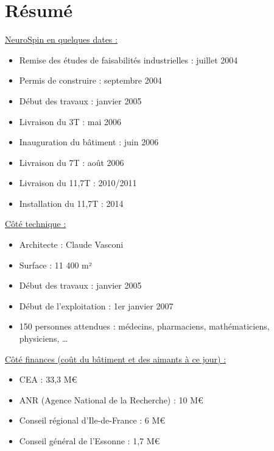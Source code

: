 \section{Résumé}

\underline{NeuroSpin en quelques dates :}

\begin{itemize}
	\smallskip
	\item Remise des études de faisabilités industrielles : juillet 2004
	\item Permis de construire : septembre 2004
	\item Début des travaux : janvier 2005
	\item Livraison du 3T : mai 2006
	\item Inauguration du bâtiment : juin 2006
	\item Livraison du 7T : août 2006
	\item Livraison du 11,7T : 2010/2011
	\item Installation du 11,7T : 2014 
\end{itemize}
\medskip

\underline{Côté technique :}

\begin{itemize}
	\smallskip
	\item  Architecte : Claude Vasconi
	\item  Surface : 11 400 m²
	\item  Début des travaux : janvier 2005
	\item  Début de l’exploitation : 1er janvier 2007
	\item  150 personnes attendues : médecins, pharmaciens, mathématiciens, physiciens, …
\end{itemize}
\medskip

\underline{Côté finances (coût du bâtiment et des aimants à ce jour) :}

\begin{itemize}
	\smallskip
	\item CEA : 33,3 M\euro
	\item ANR (Agence National de la Recherche) : 10 M\euro
	\item Conseil régional d’Ile-de-France : 6 M\euro
	\item Conseil général de l’Essonne : 1,7 M\euro
\end{itemize}